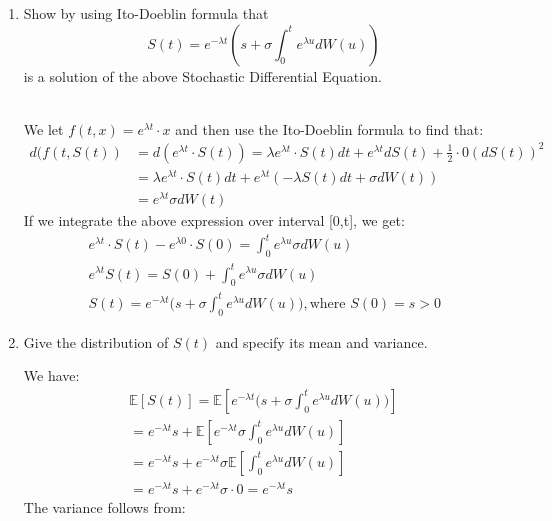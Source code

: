 \documentclass[12pt,twoside, letter]{exam}
\theoremstyle{definition}
\newcommand{\ee}{\mathbb{E}}
\begin{document}
\begin{enumerate}
  \item Show by using Ito-Doeblin formula that
    \begin{equation*}
      S(t) = e^{-\lambda t}(s + \sigma \int^t_0 e^{\lambda u} dW(u))
    \end{equation*}
    is a solution of the above Stochastic Differential Equation.

    \begin{solution}
      \\
      We let $f(t,x) = e^{\lambda t}\cdot x$ and then use the Ito-Doeblin formula to find that:
      \begin{align*}
        d(f(t,S(t)) &= d(e^{\lambda t}\cdot S(t)) = \lambda e^{\lambda t} \cdot S(t) dt + e^{\lambda t} dS(t) + \frac{1}{2} \cdot 0 (dS(t))^2 \\
        &= \lambda e^{\lambda t} \cdot S(t) dt + e^{\lambda t} (-\lambda S(t) dt + \sigma dW(t)) \\
        &= e^{\lambda t} \sigma dW(t)
      \end{align*}
      If we integrate the above expression over interval [0,t], we get:
      \begin{align*}
        &e^{\lambda t}\cdot S(t) - e^{\lambda 0}\cdot S(0) = \int^t_0 e^{\lambda u} \sigma dW(u) \\
        &e^{\lambda t} S(t) = S(0) + \int^t_0 e^{\lambda u} \sigma dW(u) \\
        &S(t) = e^{-\lambda t}\big(s + \sigma \int^t_0 e^{\lambda u}  dW(u) \big), \text{where $S(0) = s > 0$ }
      \end{align*}
    \end{solution}
  \item Give the distribution of $S(t)$ and specify its mean and variance.
    \begin{solution}
      We have:
      \begin{align*}
        \ee[S(t)] = \ee[e^{-\lambda t}\big(s + \sigma \int^t_0 e^{\lambda u}  dW(u) \big)] \\
        = e^{-\lambda t}s + \ee[e^{-\lambda t}\sigma \int^t_0 e^{\lambda u}  dW(u)] \\
        = e^{-\lambda t}s + e^{-\lambda t}\sigma \ee[ \int^t_0 e^{\lambda u}  dW(u)] \\
        = e^{-\lambda t}s + e^{-\lambda t}\sigma\cdot 0 = e^{-\lambda t}s
      \end{align*}
      The variance follows from:
      \begin{align*}

\end{align*}
\end{solution}
\end{enumerate}
\end{document}
